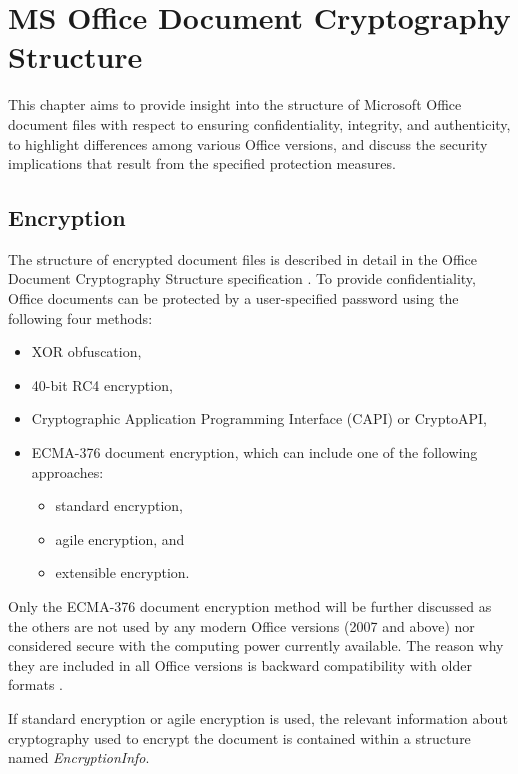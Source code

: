 \documentclass[11pt,oneside]{fithesis2}
\begin{document}
\chapter{MS Office Document Cryptography Structure}\label{ch_ms}

This chapter aims to provide insight into the structure of Microsoft Office document files with respect to ensuring confidentiality, integrity, and authenticity, to highlight differences among various Office versions, and discuss the security implications that result from the specified protection measures.

\section{Encryption}\label{ms_encryption}

The structure of encrypted document files is described in detail in the Office Document Cryptography Structure specification \cite{msoffcrypto}. To provide confidentiality, Office documents can be protected by a user-specified password using the following four methods:
\begin{itemize}
\setlength\itemsep{0.1em}
\item{XOR obfuscation,}
\item{40-bit RC4 encryption,}
\item{Cryptographic Application Programming Interface (CAPI) or CryptoAPI,}
\item{ECMA-376 document encryption, which can include one of the following approaches: }
	\begin{itemize}
	\setlength\itemsep{0.1em}
	\item{standard encryption,}
	\item{agile encryption, and}
	\item{extensible encryption.}
	\end{itemize}
\end{itemize}

Only the ECMA-376 document encryption method will be further discussed as the others are not used by any modern Office versions (2007 and above) nor considered secure with the computing power currently available. The reason why they are included in all Office versions is backward compatibility with older formats \cite{msoffcrypto}.

If standard encryption or agile encryption is used, the relevant information about cryptography used to encrypt the document is contained within a structure named \textit{EncryptionInfo}.
\end{document}
